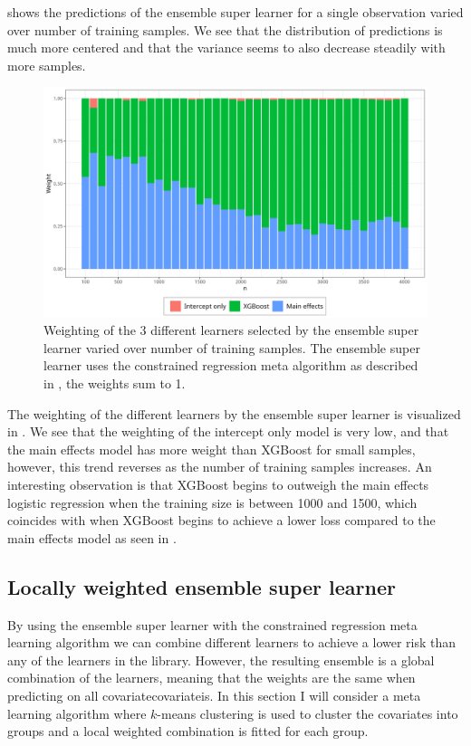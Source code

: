 \documentclass[./main.tex]{subfiles}
\begin{document}
 shows the predictions of the ensemble super learner for a single observation varied over number of training samples. We see that the distribution of predictions is much more centered and that the variance seems to also decrease steadily with more samples. 
\begin{figure}[H]
    \centering
    \includegraphics[width=\textwidth]{figures/esl_weights.png}
    \caption{Weighting of the 3 different learners selected by the ensemble super learner varied over number of training samples. The ensemble super learner uses the constrained regression meta algorithm as described in , the weights sum to 1.}
    \label{fig:esl_weights}
\end{figure}
The weighting of the different learners by the ensemble super learner is visualized in . We see that the weighting of the intercept only model is very low, and that the main effects model has more weight than XGBoost for small samples, however, this trend reverses as the number of training samples increases. An interesting observation is that XGBoost begins to outweigh the main effects logistic regression when the training size is between 1000 and 1500, which coincides with when XGBoost begins to achieve a lower loss compared to the main effects model as seen in .

\subsection{Locally weighted ensemble super learner} \label{locally_weighted_ensemble_super_learner}
By using the ensemble super learner with the constrained regression meta learning algorithm we can combine different learners to achieve a lower risk than any of the learners in the library. However, the resulting ensemble is a global combination of the learners, meaning that the weights are the same when predicting on all covariatecovariateis. In this section I will consider a meta learning algorithm where $ k $-means clustering is used to cluster the covariates into groups and a local weighted combination is fitted for each group.
\end{document}
